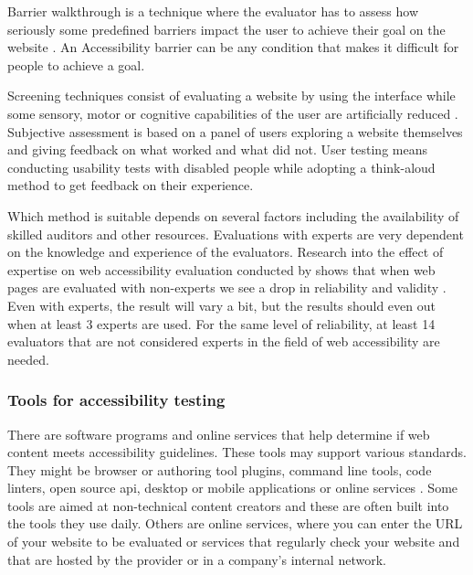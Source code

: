 \documentclass{master_thesis}
\begin{document}
Barrier walkthrough is a technique where the evaluator has to assess how seriously some predefined barriers impact the user to achieve their goal on the website \citep{Brajnik2008}. An Accessibility barrier can be any condition that makes it difficult for people to achieve a goal.

Screening techniques consist of evaluating a website by using the interface while some sensory, motor or cognitive capabilities of the user are artificially reduced \citep{Brajnik2008}. Subjective assessment is based on a panel of users exploring a website themselves and giving feedback on what worked and what did not. User testing means conducting usability tests with disabled people while adopting a think-aloud method to get feedback on their experience.

Which method is suitable depends on several factors including the availability of skilled auditors and other resources. Evaluations with experts are very dependent on the knowledge and experience of the evaluators. Research into the effect of expertise on web accessibility evaluation conducted by \citeauthor{Brajnik2011} shows that when web pages are evaluated with non-experts we see a drop in reliability and validity \citep{Brajnik2011}. Even with experts, the result will vary a bit, but the results should even out when at least 3 experts are used. For the same level of reliability, at least 14 evaluators that are not considered experts in the field of web accessibility are needed.


\subsubsection{Tools for accessibility testing}

There are software programs and online services that help determine if web content meets accessibility guidelines. These tools may support various standards. They might be browser or authoring tool plugins, command line tools, code linters, open source \ac{api}, desktop or mobile applications or online services \citep{AbouZahra2017}. Some tools are aimed at non-technical content creators and these are often built into the tools they use daily. Others are online services, where you can enter the URL of your website to be evaluated or services that regularly check your website and that are hosted by the provider or in a company's internal network.
\end{document}
